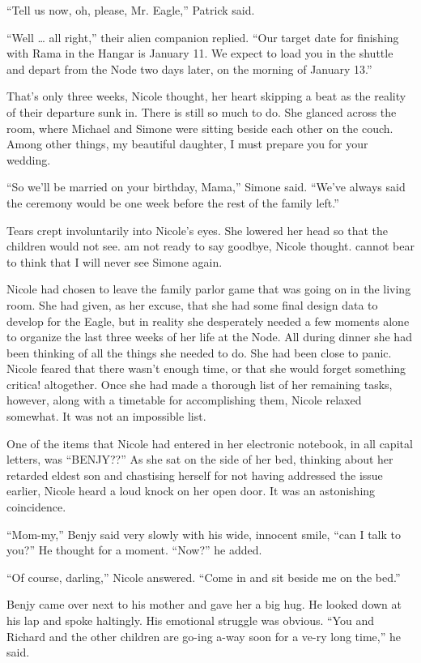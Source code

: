\documentclass[]{article}
\begin{document}
{“Tell us now, oh, please, Mr.  Eagle,” Patrick said.

“Well … all right,” their alien companion replied.  “Our target date for finishing with Rama in the Hangar is January 11.  We expect to load you in the shuttle and depart from the Node two days later, on the morning of January 13.”

That’s only three weeks, Nicole thought, her heart skipping a beat as the reality of their departure sunk in.  There is still so much to do.  She glanced across the room, where Michael and Simone were sitting beside each other on the couch.  Among other things, my beautiful daughter, I must prepare you for your wedding.

“So we’ll be married on your birthday, Mama,” Simone said.  “We’ve always said the ceremony would be one week before the rest of the family left.”

Tears crept involuntarily into Nicole’s eyes.  She lowered her head so that the children would not see.  am not ready to say goodbye, Nicole thought.  cannot bear to think that I will never see Simone again.

Nicole had chosen to leave the family parlor game that was going on in the living room.  She had given, as her excuse, that she had some final design data to develop for the Eagle, but in reality she desperately needed a few moments alone to organize the last three weeks of her life at the Node.  All during dinner she had been thinking of all the things she needed to do.  She had been close to panic.  Nicole feared that there wasn’t enough time, or that she would forget something critica! altogether.  Once she had made a thorough list of her remaining tasks, however, along with a timetable for accomplishing them, Nicole relaxed somewhat.  It was not an impossible list.

One of the items that Nicole had entered in her electronic notebook, in all capital letters, was “BENJY??” As she sat on the side of her bed, thinking about her retarded eldest son and chastising herself for not having addressed the issue earlier, Nicole heard a loud knock on her open door.  It was an astonishing coincidence.

“Mom-my,” Benjy said very slowly with his wide, innocent smile, “can I talk to you?” He thought for a moment.  “Now?” he added.

“Of course, darling,” Nicole answered.  “Come in and sit beside me on the bed.”

Benjy came over next to his mother and gave her a big hug.  He looked down at his lap and spoke haltingly.  His emotional struggle was obvious.  “You and Richard and the other children are go-ing a-way soon for a ve-ry long time,” he said.

}
\end{document}
